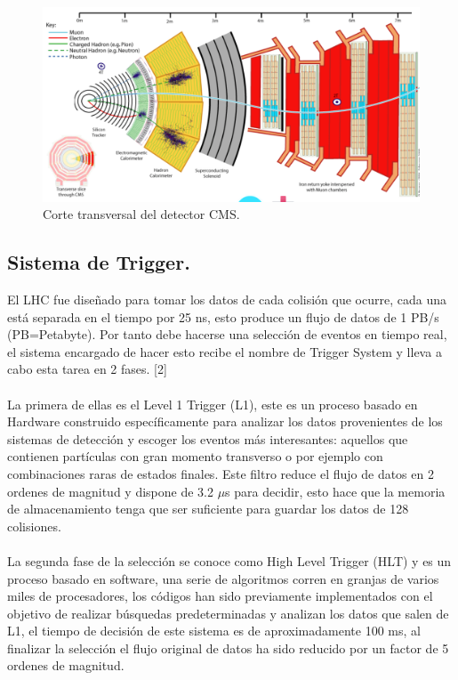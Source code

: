\begin{figure}
\centering
\includegraphics[width=15cm]{F3.png}
\caption{\label{fig:frog} Corte transversal del detector CMS.}
\end{figure}

\subsection{Sistema de Trigger.}

El LHC fue diseñado para tomar los datos de cada colisión que ocurre, cada una está separada en el tiempo por 25 ns, esto produce un flujo de datos de 1 PB/s (PB=Petabyte). Por tanto debe hacerse una selección de eventos en tiempo real, el sistema encargado de hacer esto recibe el nombre de Trigger System y lleva a cabo esta tarea en 2 fases. [2]
\\
\\
La primera de ellas es el Level 1 Trigger (L1), este es un proceso basado en Hardware construido específicamente para analizar los datos provenientes de los sistemas de detección y escoger los eventos más interesantes: aquellos que contienen partículas con gran momento transverso o por ejemplo con combinaciones raras de estados finales. Este filtro reduce el flujo de datos en 2 ordenes de magnitud y dispone de 3.2 $\mu$s para decidir, esto hace que la memoria de almacenamiento tenga que ser suficiente para guardar los datos de 128  colisiones.
\\
\\
La segunda fase de la selección se conoce como High Level Trigger (HLT) y es un proceso basado en software, una serie de algoritmos corren en granjas de varios miles de procesadores, los códigos han sido previamente implementados con el objetivo de realizar búsquedas predeterminadas y analizan los datos que salen de L1, el tiempo de decisión de este sistema es de aproximadamente 100 ms, al finalizar la selección el flujo original de datos ha sido reducido por un factor de 5 ordenes de magnitud.

